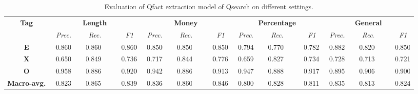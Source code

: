 \begin{table}[t]
\centering
\caption{Evaluation of Qfact extraction model of Qsearch on different settings.}
\begin{tabular}{c |r r r|r r r|r r r|r r r} \midrule
 \multirow{2}{*}{\textbf{Tag}} & \multicolumn{3}{c}{\textbf{Length}} & \multicolumn{3}{|c}{\textbf{Money}}  & \multicolumn{3}{|c}{\textbf{Percentage}}  & \multicolumn{3}{|c}{\textbf{General}} \\
 \cmidrule{2-13}
 & \textit{~Prec.} &  \textit{~~~Rec.} & \textit{~~~~~F1~} & \textit{~Prec.} &  \textit{~~~Rec.} & \textit{~~~~~F1~} & \textit{~Prec.} &  \textit{~~~Rec.} & \textit{~~~~~F1~} & \textit{~Prec.} &  \textit{~~~Rec.} & \textit{~~~~~F1~} \\
 \midrule
\textbf{E} & 0.860 & 0.860 & 0.860 & 0.850 & 0.850 & 0.850 & 0.794 & 0.770 & 0.782 & 0.882 & 0.820 & 0.850 \\
\textbf{X} & 0.650 & 0.849 & 0.736 & 0.717 & 0.844 & 0.776 & 0.659 & 0.827 & 0.734 & 0.728 & 0.713 & 0.721 \\
\textbf{O} & 0.958 & 0.886 & 0.920 & 0.942 & 0.886 & 0.913 & 0.947 & 0.888 & 0.917 & 0.895 & 0.906 & 0.900 \\
 \midrule
\textbf{Macro-avg.} & 0.823 & 0.865 & 0.839 & 0.836 & 0.860 & 0.846 & 0.800 & 0.828 & 0.811 & 0.835 & 0.813 & 0.824 \\
 \midrule
\end{tabular}
\label{table:extract_quality}
\end{table}

